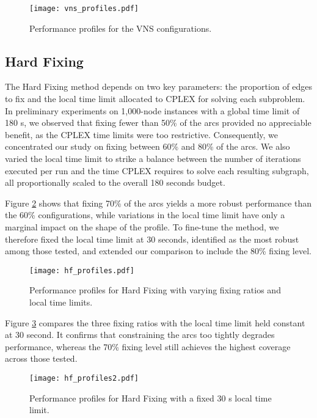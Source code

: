 \begin{figure}[H]
  \centering
  \texttt{[image: vns\_profiles.pdf]}
  \caption{Performance profiles for the VNS configurations.}
  \label{fig:vns-profiles}
\end{figure}

\subsection{Hard Fixing}
\label{ssec:hard-fixing}

The Hard Fixing method depends on two key parameters: the proportion of edges to fix and the local time limit allocated to CPLEX for solving each subproblem. In preliminary experiments on 1,000-node instances with a global time limit of 180 s, we observed that fixing fewer than 50\% of the arcs provided no appreciable benefit, as the CPLEX time limits were too restrictive. Consequently, we concentrated our study on fixing between 60\% and 80\% of the arcs. We also varied the local time limit to strike a balance between the number of iterations executed per run and the time CPLEX requires to solve each resulting subgraph, all proportionally scaled to the overall 180 seconds budget.

Figure \ref{fig:hf-profiles-general} shows that fixing 70\% of the arcs yields a more robust performance than the 60\% configurations, while variations in the local time limit have only a marginal impact on the shape of the profile. To fine-tune the method, we therefore fixed the local time limit at 30 seconds, identified as the most robust among those tested, and extended our comparison to include the 80\% fixing level.

\begin{figure}[H]
  \centering
  \texttt{[image: hf\_profiles.pdf]}
  \caption{Performance profiles for Hard Fixing with varying fixing ratios and local time limits.}
  \label{fig:hf-profiles-general}
\end{figure}

Figure \ref{fig:hf-profiles-30sec} compares the three fixing ratios with the local time limit held constant at 30 second. It confirms that constraining the arcs too tightly degrades performance, whereas the 70\% fixing level still achieves the highest coverage across those tested.

\begin{figure}[H]
  \centering
  \texttt{[image: hf\_profiles2.pdf]}
  \caption{Performance profiles for Hard Fixing with a fixed 30 s local time limit.}
  \label{fig:hf-profiles-30sec}
\end{figure}

